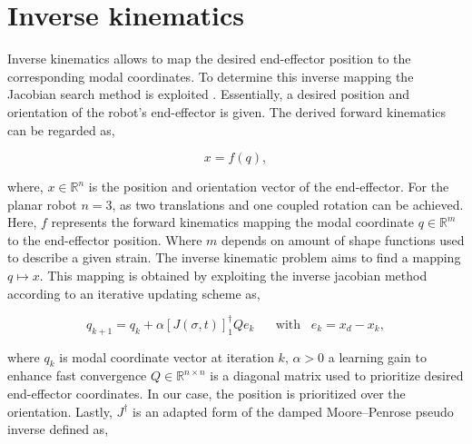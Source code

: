 \section{Inverse kinematics}
\label{app:chap2}



Inverse kinematics allows to map the desired end-effector position to the corresponding modal coordinates. To determine this inverse mapping the Jacobian search method is exploited \cite{JacobianInverse}. Essentially, a desired position and orientation of the robot's end-effector is given. The derived forward kinematics can be regarded as,

\begin{equation}
    x = f(q),
\end{equation}

where, $x \in \mathbb{R}^n$ is the position and orientation vector of the end-effector. For the planar robot $n = 3$, as two translations and one coupled rotation can be achieved. Here, $f$ represents the forward kinematics mapping the modal coordinate $q \in \mathbb{R}^m$ to the end-effector position. Where $m$ depends on amount of shape functions used to describe a given strain. The inverse kinematic problem aims to find a mapping $q\mapsto x$. This mapping is obtained by exploiting the inverse jacobian method according to an iterative updating scheme as,

\begin{equation}
    q_{k+1} = q_k + \alpha [J(\sigma,t)]_1^\dagger Q e_k \hspace{20pt} \text{with} \hspace{10pt}  e_k = x_d - x_k,
    \label{eq2:qupdate}
\end{equation}

where $q_k$ is modal coordinate vector at iteration $k$, $\alpha > 0$ a learning gain to enhance fast convergence $Q \in \mathbb{R}^{n\times n}$ is a diagonal matrix used to prioritize desired end-effector coordinates. In our case, the position is prioritized over the orientation. Lastly, $J^\dagger$ is an adapted form of the damped Moore–Penrose pseudo inverse defined as,

